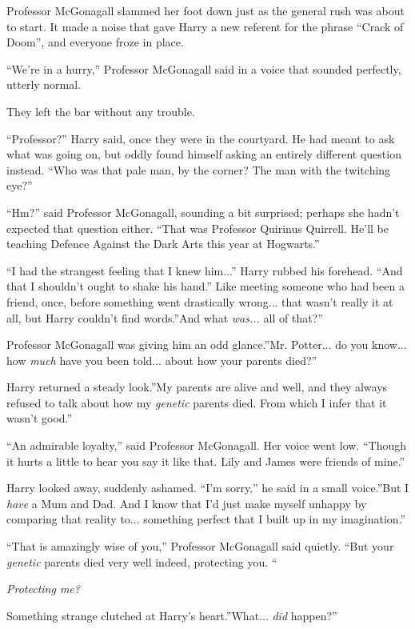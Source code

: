 Professor McGonagall slammed her foot down just as the general rush was
about to start. It made a noise that gave Harry a new referent for the
phrase ``Crack of Doom'', and everyone froze in place.

``We're in a hurry,'' Professor McGonagall said in a voice that sounded
perfectly, utterly normal.

They left the bar without any trouble.

``Professor?'' Harry said, once they were in the courtyard. He had meant
to ask what was going on, but oddly found himself asking an entirely
different question instead. ``Who was that pale man, by the corner? The
man with the twitching eye?''

``Hm?'' said Professor McGonagall, sounding a bit surprised; perhaps she
hadn't expected that question either. ``That was Professor Quirinus
Quirrell. He'll be teaching Defence Against the Dark Arts this year at
Hogwarts.''

``I had the strangest feeling that I knew him...'' Harry rubbed his
forehead. ``And that I shouldn't ought to shake his hand.'' Like meeting
someone who had been a friend, once, before something went drastically
wrong... that wasn't really it at all, but Harry couldn't find
words.''And what \emph{was...} all of that?''

Professor McGonagall was giving him an odd glance.''Mr. Potter...
do you know... how \emph{much} have you been told... about how
your parents died?''

Harry returned a steady look.''My parents are alive and well, and they
always refused to talk about how my \emph{genetic} parents died. From
which I infer that it wasn't good.''

``An admirable loyalty,'' said Professor McGonagall. Her voice went low.
``Though it hurts a little to hear you say it like that. Lily and James
were friends of mine.''

Harry looked away, suddenly ashamed. ``I'm sorry,'' he said in a small
voice.''But I \emph{have} a Mum and Dad. And I know that I'd just make
myself unhappy by comparing that reality to... something perfect
that I built up in my imagination.''

``That is amazingly wise of you,'' Professor McGonagall said quietly.
``But your \emph{genetic} parents died very well indeed, protecting you.
``

\emph{Protecting me?}

Something strange clutched at Harry's heart.''What... \emph{did}
happen?''

